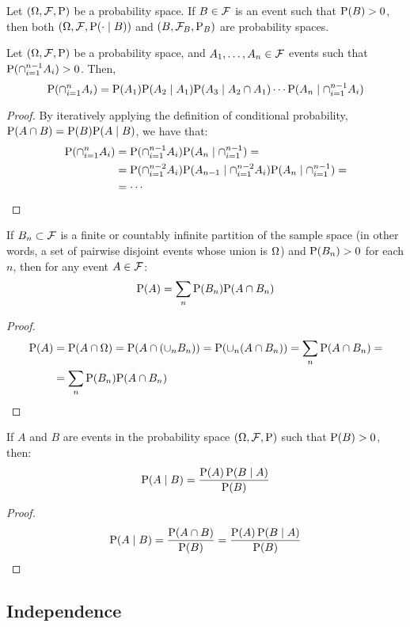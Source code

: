 \begin{prop}
	Let $(\O, \F, \P)$ be a probability space. If $B \in \F$ is an event such that $\P(B) > 0$, then both $(\O, \F, \P(\cdot \mid B))$ and $(B, \F_B, \P_B)$ are probability spaces.
\end{prop}

\begin{prop}
	Let $\PS$ be a probability space, and $A_1, \ldots, A_n \in \F$ events such that $\P(\cap_{i = 1}^{n - 1} A_i) > 0$. Then,
	\[
		\P(\cap_{i = 1}^{n} A_i) = \P(A_1) \P(A_2 \mid A_1) \P(A_3 \mid A_2 \cap A_1) \cdots \P(A_n \mid \cap_{i = 1}^{n - 1} A_i)
	\]
\end{prop}
\begin{proof}
	By iteratively applying the definition of conditional probability, $\P(A \cap B) = \P(B) \P(A \mid B)$, we have that:
	\begin{align*}
		\P(\cap_{i = 1}^{n} A_i) &= \P(\cap_{i = 1}^{n - 1} A_i)\P(A_n \mid \cap_{i = 1}^{n - 1}) = \\
		 &= \P(\cap_{i = 1} ^{n - 2} A_i) \P(A_{n - 1} \mid \cap_{i = 1} ^{n - 2} A_i) \P(A_n \mid \cap_{i = 1}^{n - 1}) = \\
		 &= \cdots
	\end{align*}
\end{proof}

\begin{prop}
	If ${B_n} \subset \F$ is a finite or countably infinite partition of the sample space (in other words, a set of pairwise disjoint events whose union is $\O$) and $\P(B_n) > 0$ for each $n$, then for any event $A \in \F$:
	\[
		\P(A) = \sum_n \P(B_n) \P(A \cap B_n)
	\]
\end{prop}
\begin{proof}
	\begin{align*}
		\P(A) &= \P(A \cap \O) = \P(A \cap (\cup_n B_n)) = \P(\cup_n (A \cap B_n)) = \sum_n \P(A \cap B_n) = \\ &= \sum_n \P(B_n) \P(A \cap B_n)
	\end{align*}
\end{proof}

\begin{prop}
	If $A$ and $B$ are events in the probability space $\PS$ such that $\P(B) > 0$, then:
	\[
		\P(A \mid B) = \frac{\P(A) \, \P(B \mid A)}{\P(B)}
	\]
\end{prop}

\begin{proof}
	\[
		\P(A \mid B) = \frac{\P(A \cap B)}{\P(B)} = \frac{\P(A) \, \P(B \mid A)}{\P(B)}
	\]
\end{proof}

\subsection{Independence}